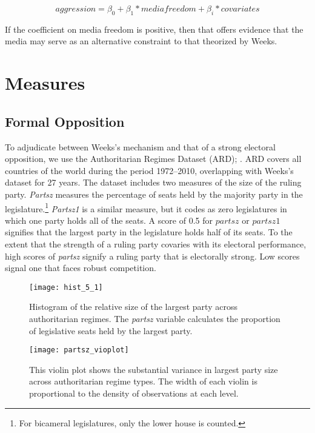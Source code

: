 \documentclass[12pt]{article}
\begin{document}
\begin{equation}
aggression = \beta_0 + \beta_1*media freedom + \beta_i*covariates
\end{equation}

\par If the coefficient on media freedom is positive, then that offers evidence that the media may serve as an alternative constraint to that theorized by Weeks. 

\section{Measures}

\subsection{Formal Opposition}

\par To adjudicate between Weeks's mechanism and that of a strong electoral opposition, we use the Authoritarian Regimes Dataset (ARD); \autocites{hadenius:2007}{wahman:2013}. ARD covers all countries of the world during the period 1972--2010, overlapping with Weeks's dataset for 27 years. The dataset includes two measures of the size of the ruling party. \textit{Partsz} measures the percentage of seats held by the majority party in the legislature.\footnote{For bicameral legislatures, only the lower house is counted.}  \textit{Partsz1} is a similar measure, but it codes as zero legislatures in which one party holds all of the seats. A score of 0.5 for $partsz$ or $partsz1$ signifies that the largest party in the legislature holds half of its seats. To the extent that the strength of a ruling party covaries with its electoral performance, high scores of \textit{partsz} signify a ruling party that is electorally strong. Low scores signal one that faces robust competition.  

\begin{figure}
	\texttt{[image: hist\_5\_1]}
	\caption{Histogram of the relative size of the largest party across authoritarian regimes. The \textit{partsz} variable calculates the proportion of legislative seats held by the largest party.}
\end{figure}

\begin{figure}
	\texttt{[image: partsz\_vioplot]}
	\caption{This violin plot shows the substantial variance in largest party size across authoritarian regime types. The width of each violin is proportional to the density of observations at each level.}
\end{figure}
\end{document}
